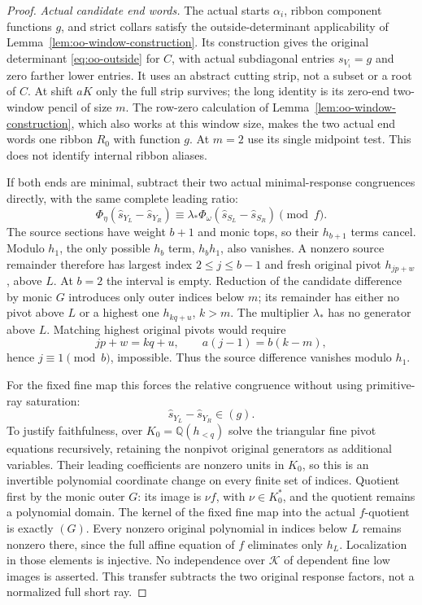\documentclass[11pt,a4paper]{amsart}
\numberwithin{equation}{section}
\theoremstyle{plain}
\theoremstyle{definition}
\begin{document}
\begin{proof}
\emph{Actual candidate end words.}
The actual starts \(\alpha_i\), ribbon component functions \(g\), and strict collars satisfy the outside-determinant applicability of Lemma~\ref{lem:oo-window-construction}.  Its construction gives the original determinant \eqref{eq:oo-outside} for \(C\), with actual subdiagonal entries \(s_{V_i}=g\) and zero farther lower entries.  It uses an abstract cutting strip, not a subset or a root of \(C\).  At shift \(aK\) only the full strip survives; the long identity is its zero-end two-window pencil of size \(m\).  The row-zero calculation of Lemma~\ref{lem:oo-window-construction}, which also works at this window size, makes the two actual end words one ribbon \(R_0\) with function \(g\).  At \(m=2\) use its single midpoint test.  This does not identify internal ribbon aliases.

If both ends are minimal, subtract their two actual minimal-response congruences directly, with the same complete leading ratio:
\[
 \Phi_\eta(\widehat s_{Y_L}-\widehat s_{Y_R})
 \equiv\lambda_*\Phi_\omega(\widehat s_{S_L}-\widehat s_{S_R})\pmod f.
\]
The source sections have weight \(b+1\) and monic tops, so their \(h_{b+1}\) terms cancel.  Modulo \(h_1\), the only possible \(h_b\) term, \(h_bh_1\), also vanishes.  A nonzero source remainder therefore has largest index \(2\le j\le b-1\) and fresh original pivot \(h_{jp+w}\), above \(L\).  At \(b=2\) the interval is empty.  Reduction of the candidate difference by monic \(G\) introduces only outer indices below \(m\); its remainder has either no pivot above \(L\) or a highest one \(h_{kq+u}\), \(k>m\).  The multiplier \(\lambda_*\) has no generator above \(L\).  Matching highest original pivots would require
\[
 jp+w=kq+u,\qquad a(j-1)=b(k-m),
\]
hence \(j\equiv1\pmod b\), impossible.  Thus the source difference vanishes modulo \(h_1\).

For the fixed fine map this forces the relative congruence without using primitive-ray saturation:
\[
 \widehat s_{Y_L}-\widehat s_{Y_R}\in(g).
\]
To justify faithfulness, over \(K_0=\mathbb Q(h_{<q})\) solve the triangular fine pivot equations recursively, retaining the nonpivot original generators as additional variables.  Their leading coefficients are nonzero units in \(K_0\), so this is an invertible polynomial coordinate change on every finite set of indices.  Quotient first by the monic outer \(G\): its image is \(\nu f\), with \(\nu\in K_0^*\), and the quotient remains a polynomial domain.  The kernel of the fixed fine map into the actual \(f\)-quotient is exactly \((G)\).  Every nonzero original polynomial in indices below \(L\) remains nonzero there, since the full affine equation of \(f\) eliminates only \(h_L\).  Localization in those elements is injective.  No independence over \(\mathcal K\) of dependent fine low images is asserted.  This transfer subtracts the two original response factors, not a normalized full short ray.


\end{proof}
\end{document}
